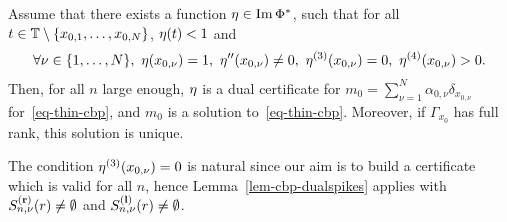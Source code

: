 \begin{lem}
  Assume that there exists a function $\eta\in \operatorname{Im} \Phi^*$, such that for all $t\in\mathbb{T}\setminus \{x_{0,1},\ldots ,x_{0,N} \}$, $\eta(t)<1$ and 
\begin{align*}
  \forall \nu\in \{1,\ldots, N\}, \ \muc(x_{0,\nu})=1, \ \muc''(x_{0,\nu})\neq 0, \ \muc^{(3)}(x_{0,\nu})=0,\ \muc^{(4)}(x_{0,\nu})>0.
\end{align*}
Then, for all $n$ large enough, $\eta$ is a dual certificate for $m_0= \sum_{\nu=1}^N \alpha_{0,\nu}\delta_{x_{0,\nu}}$ for~\eqref{eq-thin-cbp}, and $m_0$ is a solution to~\eqref{eq-thin-cbp}. Moreover, if $\Gamma_{x_0}$ has full rank, this solution is unique.
\label{lem-source-cbp}
\end{lem}

\begin{rem} The condition $\eta^{(3)}(x_{0,\nu})=0$ is natural since our aim is to build a certificate which is valid for all $n$, hence Lemma~\ref{lem-cbp-dualspikes} applies with $S_{n,\nu}^{\mathbf{(r)}}(r)\neq \emptyset$ and $S_{n,\nu}^{\mathbf{(l)}}(r)\neq \emptyset$.  
\end{rem}

